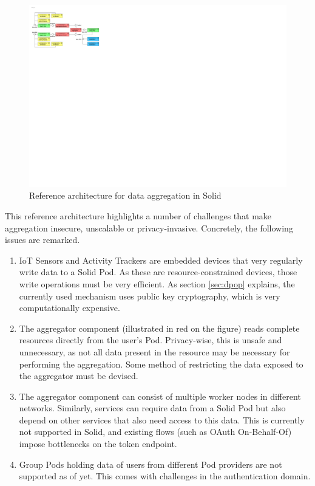 \begin{figure}[h]
    \centering
    \includegraphics[width=1.0\textwidth]{images/architecture/Reference-Architecture-Aggregator.pdf}
    \caption{Reference architecture for data aggregation in Solid}
    \label{fig:reference-architecture}
\end{figure}

\noindent This reference architecture highlights a number of challenges that make aggregation insecure, unscalable or privacy-invasive. Concretely, the following issues are remarked.

\begin{enumerate}
    \item IoT Sensors and Activity Trackers are embedded devices that very regularly write data to a Solid Pod. As these are resource-constrained devices, those write operations must be very efficient. As section \ref{sec:dpop} explains, the currently used mechanism uses public key cryptography, which is very computationally expensive.
    \item The aggregator component (illustrated in red on the figure) reads complete resources directly from the user's Pod. Privacy-wise, this is unsafe and unnecessary, as not all data present in the resource may be necessary for performing the aggregation. Some method of restricting the data exposed to the aggregator must be devised.
    \item The aggregator component can consist of multiple worker nodes in different networks. Similarly, services can require data from a Solid Pod but also depend on other services that also need access to this data. This is currently not supported in Solid, and existing flows (such as OAuth On-Behalf-Of) impose bottlenecks on the token endpoint. 
    \item Group Pods holding data of users from different Pod providers are not supported as of yet. This comes with challenges in the authentication domain.
\end{enumerate}

